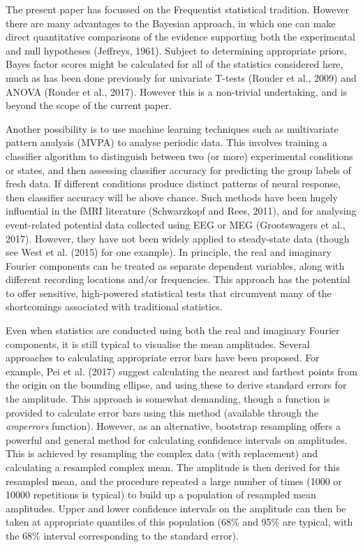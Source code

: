 \documentclass[]{article}
\begin{document}
The present paper has focussed on the Frequentist statistical tradition. However there are many advantages to the Bayesian approach, in which one can make direct quantitative comparisons of the evidence supporting both the experimental and null hypotheses (Jeffreys, 1961). Subject to determining appropriate priors, Bayes factor scores might be calculated for all of the statistics considered here, much as has been done previously for univariate T-tests (Rouder et al., 2009) and ANOVA (Rouder et al., 2017). However this is a non-trivial undertaking, and is beyond the scope of the current paper.

Another possibility is to use machine learning techniques such as multivariate pattern analysis (MVPA) to analyse periodic data. This involves training a classifier algorithm to distinguish between two (or more) experimental conditions or states, and then assessing classifier accuracy for predicting the group labels of fresh data. If different conditions produce distinct patterns of neural response, then classifier accuracy will be above chance. Such methods have been hugely influential in the fMRI literature (Schwarzkopf and Rees, 2011), and for analysing event-related potential data collected using EEG or MEG (Grootswagers et al., 2017). However, they have not been widely applied to steady-state data (though see West et al. (2015) for one example). In principle, the real and imaginary Fourier components can be treated as separate dependent variables, along with different recording locations and/or frequencies. This approach has the potential to offer sensitive, high-powered statistical tests that circumvent many of the shortcomings associated with traditional statistics.

Even when statistics are conducted using both the real and imaginary Fourier components, it is still typical to visualise the mean amplitudes. Several approaches to calculating appropriate error bars have been proposed. For example, Pei et al. (2017) suggest calculating the nearest and farthest points from the origin on the bounding ellipse, and using these to derive standard errors for the amplitude. This approach is somewhat demanding, though a function is provided to calculate error bars using this method (available through the \emph{amperrors} function). However, as an alternative, bootstrap resampling offers a powerful and general method for calculating confidence intervals on amplitudes. This is achieved by resampling the complex data (with replacement) and calculating a resampled complex mean. The amplitude is then derived for this resampled mean, and the procedure repeated a large number of times (1000 or 10000 repetitions is typical) to build up a population of resampled mean amplitudes. Upper and lower confidence intervals on the amplitude can then be taken at appropriate quantiles of this population (68\% and 95\% are typical, with the 68\% interval corresponding to the standard error).
\end{document}
